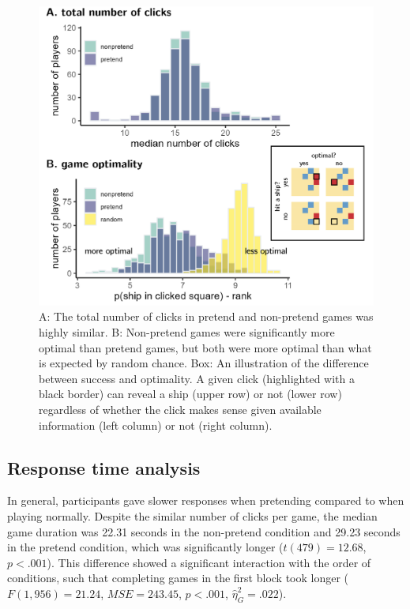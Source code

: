 \documentclass[10pt, letterpaper]{article}
\newenvironment{CodeChunk}{}{}
\begin{document}
\begin{CodeChunk}
\begin{figure}[tb]
\includegraphics[width=1\linewidth]{../figures/numclicks_optimality} \caption[A]{A: The total number of clicks in pretend and non-pretend games was highly similar. B: Non-pretend games were significantly more optimal than pretend games, but both were more optimal than what is expected by random chance. Box: An illustration of the difference between success and optimality. A given click (highlighted with a black border) can reveal a ship (upper row) or not (lower row) regardless of whether the click makes sense given available information (left column) or not (right column). }\label{fig:numclick_optimality}
\end{figure}
\end{CodeChunk}

\hypertarget{response-time-analysis}{%
\subsection{Response time analysis}\label{response-time-analysis}}

In general, participants gave slower responses when pretending compared
to when playing normally. Despite the similar number of clicks per game,
the median game duration was 22.31 seconds in the non-pretend condition
and 29.23 seconds in the pretend condition, which was significantly
longer (\(t(479) = 12.68\), \(p < .001\)). This difference showed a
significant interaction with the order of conditions, such that
completing games in the first block took longer (\(F(1, 956) = 21.24\),
\(\mathit{MSE} = 243.45\), \(p < .001\), \(\hat{\eta}^2_G = .022\)).
\end{document}
